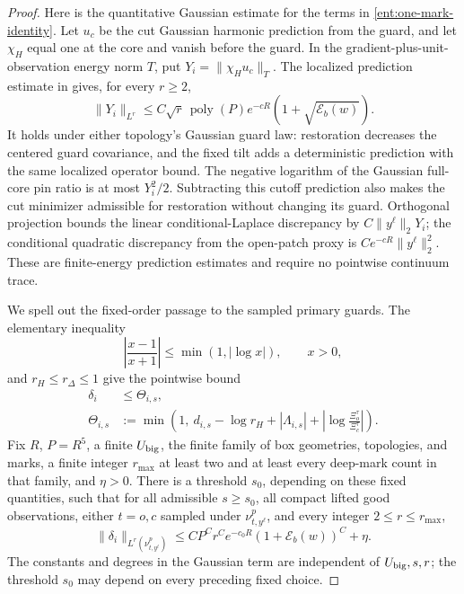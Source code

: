 \begin{proof}
Here is the quantitative Gaussian estimate for the terms in
\eqref{ent:one-mark-identity}.  Let \(u_c\) be the cut Gaussian
harmonic prediction from the guard, and let \(\chi_H\) equal one at
the core and vanish before the guard.  In the gradient-plus-unit-
observation energy norm \(T\), put \(Y_i=\|\chi_Hu_c\|_T\).  The
localized prediction estimate in \cite[Equation~(9.23)]{B} gives,
for every \(r\ge2\),
\begin{equation}\label{ent:prediction}
 \|Y_i\|_{L^r}
       \le C\sqrt r\,\operatorname{poly}(P)e^{-cR}
                         (1+\sqrt{\mathcal E_b(w)}).
\end{equation}
It holds under either topology's Gaussian guard law: restoration
decreases the centered guard covariance, and the fixed tilt adds a
deterministic prediction with the same localized operator bound.
The negative logarithm of the Gaussian full-core pin ratio is at
most \(Y_i^2/2\).  Subtracting this cutoff prediction also makes
the cut minimizer admissible for restoration without changing its
guard.  Orthogonal projection bounds the linear conditional-Laplace
discrepancy by \(C\|y^\ell\|_2Y_i\); the conditional quadratic
discrepancy from the open-patch proxy is
\(Ce^{-cR}\|y^\ell\|_2^2\).  These are finite-energy prediction
estimates and require no pointwise continuum trace.

We spell out the fixed-order passage to the sampled primary guards.
The elementary inequality
\[
 \left|\frac{x-1}{x+1}\right|\le\min(1,|\log x|),\qquad x>0,
\]
and \(r_H\le r_\Delta\le1\) give the pointwise bound
\[
\begin{split}
 \delta_i&\le\Theta_{i,s},\\
 \Theta_{i,s}&:=
 \min\left(1,\ d_{i,s}-\log r_H+|\Lambda_{i,s}|
                    +\left|\log\frac{\Xi_o^\tau}{\Xi_c^\tau}\right|\right).
\end{split}
\]
Fix \(R\), \(P=R^5\), a finite \(U_{\rm big}\), the finite family of
box geometries, topologies, and marks, a finite integer \(r_{\max}\) at least
two and at least every deep-mark count in that family, and
\(\eta>0\).  There is a
threshold \(s_0\), depending on these fixed quantities, such that
for all admissible \(s\ge s_0\), all compact lifted good observations,
either \(t=o,c\) sampled under \(\nu_{t,y^\ell}^p\), and every integer
\(2\le r\le r_{\max}\),
\begin{equation}\label{ent:one-mark-moment}
 \|\delta_i\|_{L^r(\nu_{t,y^\ell}^p)}
 \le C P^C r^C e^{-c_0R}(1+\mathcal E_b(w))^C+\eta .
\end{equation}
The constants and degrees in the Gaussian term are independent of
\(U_{\rm big},s,r\); the threshold \(s_0\) may depend on every
preceding fixed choice.


\end{proof}
